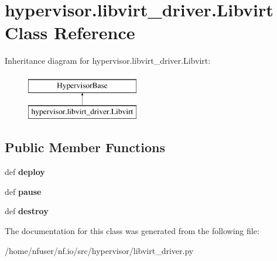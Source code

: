 \hypertarget{classhypervisor_1_1libvirt__driver_1_1Libvirt}{\section{hypervisor.\-libvirt\-\_\-driver.\-Libvirt Class Reference}
\label{classhypervisor_1_1libvirt__driver_1_1Libvirt}
}
Inheritance diagram for hypervisor.\-libvirt\-\_\-driver.\-Libvirt\-:\begin{figure}[H]
\begin{center}
\leavevmode
\includegraphics[height=2.000000cm]{classhypervisor_1_1libvirt__driver_1_1Libvirt}
\end{center}
\end{figure}
\subsection*{Public Member Functions}
\begin{DoxyCompactItemize}
\item 
\hypertarget{classhypervisor_1_1libvirt__driver_1_1Libvirt_ab8f6a87c28e570ecc55693e665b915fa}{def {\bfseries deploy}}\label{classhypervisor_1_1libvirt__driver_1_1Libvirt_ab8f6a87c28e570ecc55693e665b915fa}

\item 
\hypertarget{classhypervisor_1_1libvirt__driver_1_1Libvirt_ae82b6fcef27839a8db06edfb0857ee9e}{def {\bfseries pause}}\label{classhypervisor_1_1libvirt__driver_1_1Libvirt_ae82b6fcef27839a8db06edfb0857ee9e}

\item 
\hypertarget{classhypervisor_1_1libvirt__driver_1_1Libvirt_a48a5b9aa63f54fff5c4bcfd2dbdf104a}{def {\bfseries destroy}}\label{classhypervisor_1_1libvirt__driver_1_1Libvirt_a48a5b9aa63f54fff5c4bcfd2dbdf104a}

\end{DoxyCompactItemize}


The documentation for this class was generated from the following file\-:\begin{DoxyCompactItemize}
\item 
/home/nfuser/nf.\-io/src/hypervisor/libvirt\-\_\-driver.\-py\end{DoxyCompactItemize}
